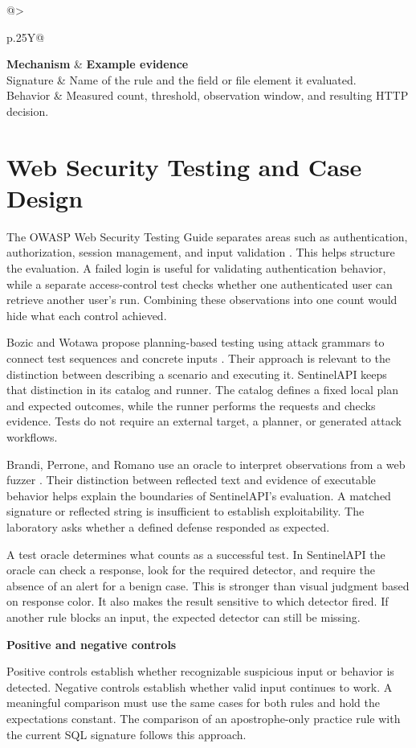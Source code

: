 \documentclass[11pt,a4paper,oneside]{report}
\makeatletter
\newcommand{\topic}[1]{\smallskip\noindent\textbf{#1}\par\nobreak\vspace{-.39em}}
\newcommand{\sheet}[1]{\clearpage\section{#1}}
\newcommand{\tabletitle}[1]{\captionof{table}{#1}\smallskip}
\newcommand{\bodytable}[1]{\begin{tabularx}{\linewidth}{@{}>{\raggedright\arraybackslash}p{.25\linewidth}Y@{}}\toprule #1\bottomrule\end{tabularx}}
\makeatother
\begin{document}
\tabletitle{Two sources of detection evidence}
\bodytable{\textbf{Mechanism} & \textbf{Example evidence}\\\midrule
Signature & Name of the rule and the field or file element it evaluated.\\
Behavior & Measured count, threshold, observation window, and resulting HTTP decision.\\}

\sheet{Web Security Testing and Case Design}
The OWASP Web Security Testing Guide separates areas such as authentication, authorization, session management, and input validation \cite{owasp}. This helps structure the evaluation. A failed login is useful for validating authentication behavior, while a separate access-control test checks whether one authenticated user can retrieve another user's run. Combining these observations into one count would hide what each control achieved.

Bozic and Wotawa propose planning-based testing using attack grammars to connect test sequences and concrete inputs \cite{bozic}. Their approach is relevant to the distinction between describing a scenario and executing it. SentinelAPI keeps that distinction in its catalog and runner. The catalog defines a fixed local plan and expected outcomes, while the runner performs the requests and checks evidence. Tests do not require an external target, a planner, or generated attack workflows.

Brandi, Perrone, and Romano use an oracle to interpret observations from a web fuzzer \cite{brandi}. Their distinction between reflected text and evidence of executable behavior helps explain the boundaries of SentinelAPI's evaluation. A matched signature or reflected string is insufficient to establish exploitability. The laboratory asks whether a defined defense responded as expected.

A test oracle determines what counts as a successful test. In SentinelAPI the oracle can check a response, look for the required detector, and require the absence of an alert for a benign case. This is stronger than visual judgment based on response color. It also makes the result sensitive to which detector fired. If another rule blocks an input, the expected detector can still be missing.

\topic{Positive and negative controls}
Positive controls establish whether recognizable suspicious input or behavior is detected. Negative controls establish whether valid input continues to work. A meaningful comparison must use the same cases for both rules and hold the expectations constant. The comparison of an apostrophe-only practice rule with the current SQL signature follows this approach.
\end{document}
